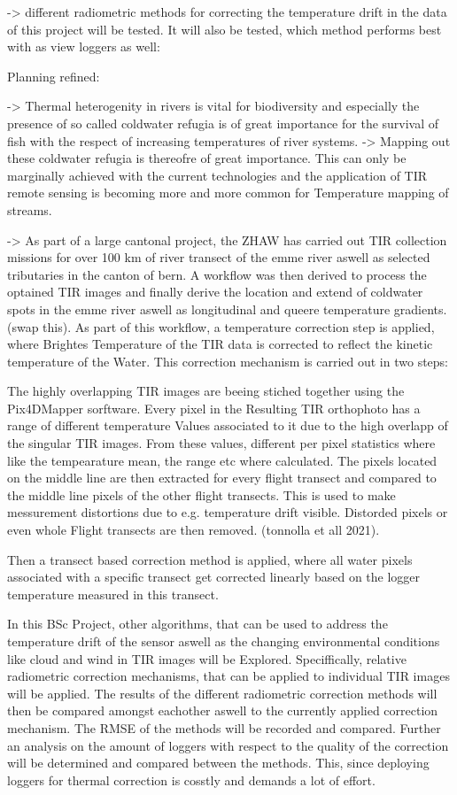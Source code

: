 -> different radiometric methods for correcting the temperature drift in the data of this project will be tested. It will also be tested, which method performs best with as view loggers as well:



Planning refined:

-> Thermal heterogenity in rivers is vital for biodiversity and especially the presence of so called coldwater refugia is of great importance for the survival of fish with the respect of increasing temperatures of river systems.
-> Mapping out these coldwater refugia is thereofre of great importance. This can only be marginally achieved with the current technologies and the application of TIR remote sensing is becoming more and more common for Temperature mapping of streams.

-> As part of a large cantonal project, the ZHAW has carried out TIR collection missions for over 100 km of river transect of the emme river aswell as selected tributaries in the canton of bern. A workflow was then derived to process the optained TIR images and finally derive the location and extend of coldwater spots in the emme river aswell as longitudinal and queere temperature gradients. (swap this). As part of this workflow, a temperature correction step is applied, where Brightes Temperature of the TIR data is corrected to reflect the kinetic temperature of the Water. This correction mechanism is carried out in two steps: 


The highly overlapping TIR images are beeing stiched together using the Pix4DMapper sorftware. Every pixel in the Resulting TIR orthophoto has a range of different temperature Values associated to it due to the high overlapp of the singular TIR images. From these values, different per pixel statistics where like the tempearature mean, the range etc where calculated. The pixels located on the middle line are then extracted for every flight transect and compared to the middle line pixels of the other flight transects. This is used to make messurement distortions due to e.g. temperature drift visible. Distorded pixels or even whole Flight transects are then removed. (tonnolla et all 2021). 

Then a transect based correction method is applied, where all water pixels associated with a specific transect get corrected linearly based on the logger temperature measured in this transect. 



In this BSc Project, other algorithms, that can be used to address the temperature drift of the sensor aswell as the changing environmental conditions like cloud and wind in TIR images will be Explored. Speciffically, relative radiometric correction mechanisms, that can be applied to individual TIR images will be applied. The results of the different radiometric correction methods will then be compared amongst eachother aswell to the currently applied correction mechanism. The RMSE of the methods will be recorded and compared. Further an analysis on the amount of loggers with respect to the quality of the correction will be determined and compared between the methods. This, since deploying loggers for thermal correction is cosstly and demands a lot of effort.


